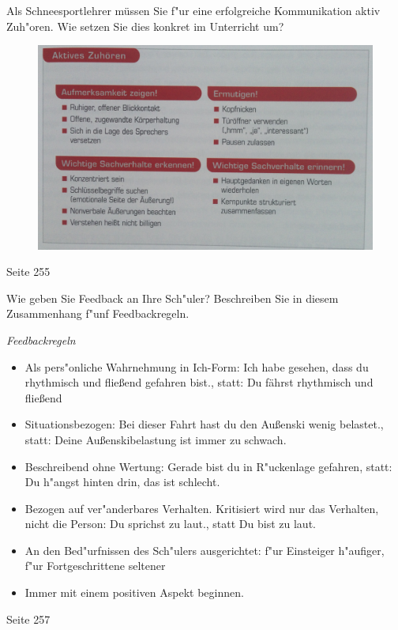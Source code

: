 \begin{question}{6}
Als Schneesportlehrer müssen Sie f"ur eine erfolgreiche Kommunikation aktiv Zuh"oren. Wie setzen Sie dies konkret im Unterricht um?
\end{question}
\begin{solution}
\begin{figure}[H]
  \centering
  \includegraphics[width=12cm]{pic/zuhoeren.jpg}
  \label{fig:zuhoeren}
\end{figure}
 Seite 255
\end{solution}

\begin{question}{6}
Wie geben Sie Feedback an Ihre Sch"uler? Beschreiben Sie in diesem Zusammenhang f"unf Feedbackregeln.
\end{question}
\begin{solution}
\emph{Feedbackregeln}
\begin{itemize}
\item Als pers"onliche Wahrnehmung in Ich-Form: Ich habe gesehen, dass du rhythmisch und fließend gefahren bist., statt: Du fährst rhythmisch und fließend
\item Situationsbezogen: Bei dieser Fahrt hast du den Außenski wenig belastet., statt: Deine Außenskibelastung ist immer zu schwach.
\item Beschreibend ohne Wertung: Gerade bist du in R"uckenlage gefahren, statt: Du h"angst hinten drin, das ist schlecht.
\item Bezogen auf ver"anderbares Verhalten. Kritisiert wird nur das Verhalten, nicht die Person: Du sprichst zu laut., statt Du bist zu laut.
\item An den Bed"urfnissen des Sch"ulers ausgerichtet: f"ur Einsteiger h"aufiger, f"ur Fortgeschrittene seltener
\item Immer mit einem positiven Aspekt beginnen.
\end{itemize}
 Seite 257
\end{solution}

